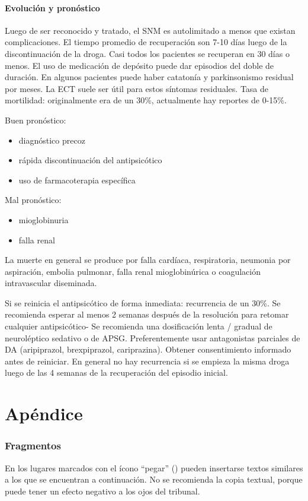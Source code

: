 \documentclass{scrbook}
\begin{document}
\subsection*{Evolución y pronóstico}
Luego de ser reconocido y tratado, el SNM es autolimitado a menos que existan complicaciones. El tiempo promedio de recuperación son 7-10 días luego de la discontinuación de la droga. Casi todos los pacientes se recuperan en 30 días o menos. El uso de medicación de depósito puede dar episodios del doble de duración. En algunos pacientes puede haber catatonía y parkinsonismo residual por meses. La ECT suele ser útil para estos síntomas residuales.
Tasa de mortilidad: originalmente era de un 30\%, actualmente hay reportes de 0-15\%.

Buen pronóstico:
\begin{itemize}
	\item diagnóstico precoz
	\item rápida discontinuación del antipsicótico
	\item uso de farmacoterapia específica
\end{itemize}
Mal pronóstico:
\begin{itemize}
	\item mioglobinuria
	\item falla renal
\end{itemize}
La muerte en general se produce por falla cardíaca, respiratoria, neumonia por aspiración, embolia pulmonar, falla renal mioglobinúrica o coagulación intravascular diseminada.

Si se reinicia el antipsicótico de forma inmediata: recurrencia de un 30\%. Se recomienda esperar al menos 2 semanas después de la resolución para retomar cualquier antipsicótico- Se recomienda una dosificación lenta / gradual de neuroléptico sedativo o de APSG. Preferentemente usar antagonistas parciales de DA (aripiprazol, brexpiprazol, cariprazina). Obtener consentimiento informado antes de reiniciar. En general no hay recurrencia si se empieza la misma droga luego de las 4 semanas de la recuperación del episodio inicial.
\printbibliography

\part{Apéndice}

\section*{Fragmentos}
En los lugares marcados con el ícono ``pegar'' (\faPaste) pueden insertarse textos similares a los que se encuentran a continuación. No se recomienda la copia textual, porque puede tener un efecto negativo a los ojos del tribunal.
\end{document}

